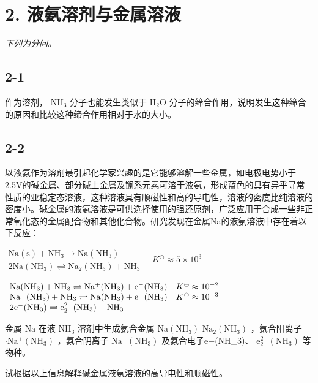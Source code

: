 \section*{2. 液氨溶剂与金属溶液}
\textit{下列为分问。}

\subsection*{2-1}
作为溶剂， $\mathrm { N H _ { 3 } }$ 分⼦也能发⽣类似于 $\mathrm { H _ { 2 } O }$ 分⼦的缔合作⽤，说明发⽣这种缔合的原因和⽐较这种缔合作⽤相对于⽔的⼤⼩。

\subsection*{2-2}
以液氨作为溶剂最引起化学家兴趣的是它能够溶解⼀些⾦属，如电极电势⼩于2.5V的碱⾦属、部分碱⼟⾦属及镧系元素可溶于液氨，形成蓝⾊的具有异乎寻常性质的亚稳定态溶液，这种溶液具有顺磁性和⾼的导电性，溶液的密度⽐纯溶液的密度⼩。碱⾦属的液氨溶液是可供选择使⽤的强还原剂，⼴泛应⽤于合成⼀些⾮正常氧化态的⾦属配合物和其他化合物。研究发现在⾦属Na的液氨溶液中存在着以下反应：

$
\begin{array}{l}\mathrm {Na(s) + NH_ {3} \rightarrow Na(NH_ {3})}\\2 \mathrm {Na(NH_ {3}) \rightleftharpoons Na_ {2} (NH_ {3}) + NH_ {3}}\end{array}\quad K ^ {\ominus} \approx 5 \times 1 0 ^ {3}
$

$
\begin{array}{l l}\mathrm {Na(NH_ {3}) + NH_ {3} \rightleftharpoons Na^ {+} (NH_ {3}) + e^ {-} (NH_ {3})}&K ^ {\ominus} \approx 1 0 ^ {- 2}\\\mathrm {Na^ {-} (NH_ {3}) + NH_ {3} \rightleftharpoons Na(NH_ {3}) + e^ {-} (NH_ {3})}&K ^ {\ominus} \approx 1 0 ^ {- 3}\\2 \mathrm {e^ {-} (NH_ {3}) \rightleftharpoons e_ {2} ^ {2 - } (NH_ {3}) + NH_ {3}}\end{array}
$

⾦属 $\mathrm { N a }$ 在液 $\mathrm { N H _ { 3 } }$ 溶剂中⽣成氨合⾦属 $\mathrm { N a } ( \mathrm { N H } _ { 3 } )$ $\mathrm { N a _ { 2 } ( N H _ { 3 } ) }$ ，氨合阳离⼦ $\cdot \mathrm { N a ^ { + } ( N H _ { 3 } ) }$ ，氨合阴离⼦ $\mathrm { N a ^ { - } ( N H _ { 3 } ) }$ 及氨合电⼦e−(NH_{3})、 $\mathrm { e } _ { 2 } ^ { 2 \mathrm { - } } \mathrm { ( N H _ { 3 } ) }$ 等物种。

试根据以上信息解释碱⾦属液氨溶液的⾼导电性和顺磁性。

